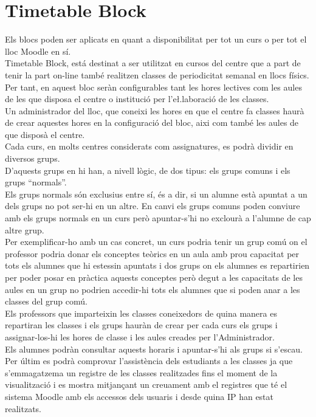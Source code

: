 \documentclass[a4paper]{report}  %
\begin{document}
\section{Timetable Block}
Els blocs poden ser aplicats en quant a disponibilitat per tot un curs o per tot el lloc Moodle en sí.\\
Timetable Block, está destinat a ser utilitzat en cursos del centre que a part de tenir la part  on-line també realitzen classes de periodicitat semanal en llocs físics.\\
Per tant, en aquest bloc seràn configurables tant les hores lectives com les aules de les que disposa el centre o institució per l'e\l.laboració de les classes. \\
Un administrador del lloc, que coneixi les hores en que el centre fa classes haurà de crear aquestes hores en la configuració del bloc, aixi com també les aules de que disposà el centre.\\
Cada curs, en molts centres considerats com assignatures, es podrà dividir en diversos grups.\\
D'aquests grups en hi han, a nivell lògic, de dos tipus: els grups comuns i els grups “normals”. \\
Els grups normals són exclusius entre sí, és a dir, si un alumne està apuntat a un dels grups no pot ser-hi en un altre. En canvi els grups comuns poden conviure amb els grups normals en un curs però apuntar-s'hi no exclourà a l'alumne de cap altre grup.\\
Per exemplificar-ho amb un cas concret, un curs podria tenir un grup comú on el professor podria donar els conceptes teòrics en un aula amb prou capacitat per tots els alumnes que hi estessin apuntats i dos grups on els alumnes es repartirien per poder posar en pràctica aquests conceptes però degut a les capacitats de les aules en un grup no podrien accedir-hi tots els alumnes que si poden anar a les classes del grup comú.\\
Els professors que imparteixin les classes coneixedors de quina manera es repartiran les classes i els grups hauràn de crear per cada curs els grups i assignar-los-hi les hores de classe i les aules creades per l'Administrador.\\
Els alumnes podràn consultar aquests horaris i apuntar-s'hi als grups si s'escau.\\
Per últim es podrà comprovar l'assistència dels estudiants a les classes ja que s'emmagatzema un registre de les classes realitzades fins el moment de la visualització i es mostra mitjançant un creuament amb el registres que té el sistema Moodle amb els accessos dels usuaris i desde quina IP han estat realitzats.\\
\end{document}

